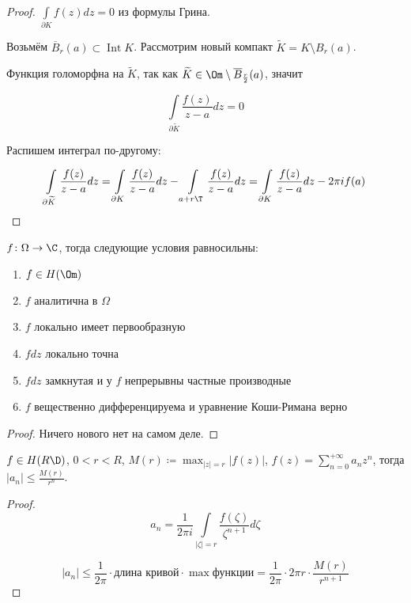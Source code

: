\begin{proof}
    $\int\limits_{\partial K} f(z)dz = 0$ из формулы Грина.

    Возьмём $\overline{B}_r(a) \subset \operatorname{Int} K$.
    Рассмотрим новый компакт $\widetilde K = K \setminus B_r(a)$.

    Функция голоморфна на $\widetilde K$, так как $\widetilde K \in \Om\setminus \overline{B}_
        \frac{r}{2}(a)$,
    значит

    \[
        \int\limits_{\partial \widetilde K} \frac{f(z)}{z-a}dz = 0
    \]

    Распишем интеграл по-другому:

    \[
        \int\limits_{\partial \widetilde K} \frac{f(z)}{z-a}dz =
        \int\limits_{\partial K} \frac{f(z)}{z-a}dz -
        \int\limits_{a + r\T} \frac{f(z)}{z-a}dz
        = \int\limits_{\partial K} \frac{f(z)}{z-a}dz -
        2\pi i f(a)
    \]
\end{proof}

\begin{theorem}
    $f\colon \Omega \to \C$, тогда следующие условия
    равносильны:

    \begin{enumerate}
        \item $f \in H(\Om)$
        \item $f$ аналитична в $\Omega$
        \item $f$ локально имеет первообразную
        \item $fdz$ локально точна
        \item $fdz$ замкнутая и у $f$ непрерывны частные производные
        \item $f$ вещественно дифференцируема
              и уравнение Коши-Римана верно
    \end{enumerate}
\end{theorem}

\begin{proof}
    Ничего нового нет на самом деле.
\end{proof}

\begin{theorem}

    $f \in H(R\D)$, $0 < r < R$,
    $M(r) \coloneqq \max_{|z| = r} |f(z)|$,
    $f(z) = \sum_{n=0}^{+\infty} a_nz^n$,
    тогда $|a_n| \le \frac{M(r)}{r^n}$.
\end{theorem}

\begin{proof}
    \[ a_n = \frac{1}{2\pi i} \int\limits_{|\zeta| = r}
        \frac{f(\zeta)}{\zeta^{n+1}} d\zeta \]

    \[ |a_n| \le \frac{1}{2\pi} \cdot
        \text{длина кривой} \cdot \max \text{функции} = \frac{1}{2\pi} \cdot
        2\pi r \cdot \frac{M(r)}{r^{n+1}} \]
\end{proof}

